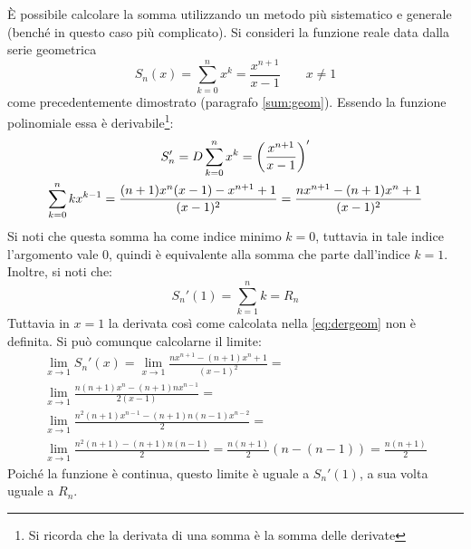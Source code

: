 È possibile calcolare la somma utilizzando un metodo più sistematico e generale (benché in questo caso più complicato). Si consideri la funzione reale data dalla serie geometrica
\[
	S_n(x)=\sum_{k=0}^n x^k=\frac{x^{n+1}}{x-1}\qquad{x\neq1}
\]
come precedentemente dimostrato (paragrafo \ref{sum:geom}). Essendo la funzione polinomiale essa è derivabile\footnote{Si ricorda che la derivata di una somma è la somma delle derivate}:
\begin{gather}
	S_n'=D\sum_{k=0}^n x^k = \left(\frac{x^{n+1}}{x-1}\right)'\notag\\
	\label{eq:dergeom}
	\sum_{k=0}^n kx^{k-1}=\frac{(n+1)x^n(x-1)-x^{n+1}+1}{(x-1)^2}=\frac{nx^{n+1}-(n+1)x^n+1}{(x-1)^2}
\end{gather}
Si noti che questa somma ha come indice minimo $k=0$, tuttavia in tale indice l'argomento vale $0$, quindi è equivalente alla somma che parte dall'indice $k=1$. Inoltre, si noti che:
\[
	S_n'(1)=\sum_{k=1}^n k=R_n
\]
Tuttavia in $x=1$ la derivata così come calcolata nella \ref{eq:dergeom} non è definita. Si può comunque calcolarne il limite:
\begin{gather*}
	\lim_{x\to1} S_n'(x)=\lim_{x\to1} \frac{nx^{n+1}-(n+1)x^n+1}{(x-1)^2}=\\[1ex]
	\lim_{x\to1} \frac{n(n+1)x^n-(n+1)nx^{n-1}}{2(x-1)}=\\[1ex]
	\lim_{x\to1} \frac{n^2(n+1)x^{n-1}-(n+1)n(n-1)x^{n-2}}{2}=\\[1ex]
	\lim_{x\to1} \frac{n^2(n+1)-(n+1)n(n-1)}{2}=\frac{n(n+1)}{2}(n-(n-1))=\frac{n(n+1)}{2}
\end{gather*}
Poiché la funzione è continua, questo limite è uguale a $S_n'(1)$, a sua volta uguale a $R_n$.

